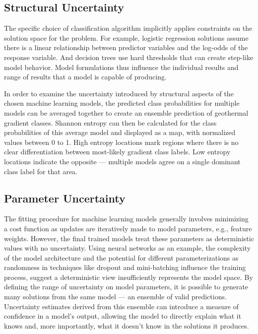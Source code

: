 \subsection{Structural Uncertainty}\label{ch3:structural_uncertainty}
The specific choice of classification algorithm implicitly applies constraints on the solution space for the problem. For example, logistic regression solutions assume there is a linear relationship between predictor variables and the log-odds of the response variable. And decision trees use hard thresholds that can create step-like model behavior. Model formulations thus influence the individual results and range of results that a model is capable of producing.

In order to examine the uncertainty introduced by structural aspects of the chosen machine learning models, the predicted class probabilities for multiple models can be averaged together to create an ensemble prediction of geothermal gradient classes. Shannon entropy can then be calculated for the class probabilities of this average model and displayed as a map, with normalized values between 0 to 1. High entropy locations mark regions where there is no clear differentiation between most-likely gradient class labels. Low entropy locations indicate the opposite --- multiple models agree on a single dominant class label for that area.

\subsection{Parameter Uncertainty}\label{ch3:param_uncertainty}
The fitting procedure for machine learning models generally involves minimizing a cost function as updates are iteratively made to model parameters, e.g., feature weights. However, the final trained models treat these parameters as deterministic values with no uncertainty. Using neural networks as an example, the complexity of the model architecture and the potential for different parameterizations as randomness in techniques like dropout and mini-batching influence the training process, suggest a deterministic view insufficiently represents the model space. By defining the range of uncertainty on model parameters, it is possible to generate many solutions from the same model --- an ensemble of valid predictions. Uncertainty estimates derived from this ensemble can introduce a measure of confidence in a model’s output, allowing the model to directly explain what it knows and, more importantly, what it doesn’t know in the solutions it produces.

